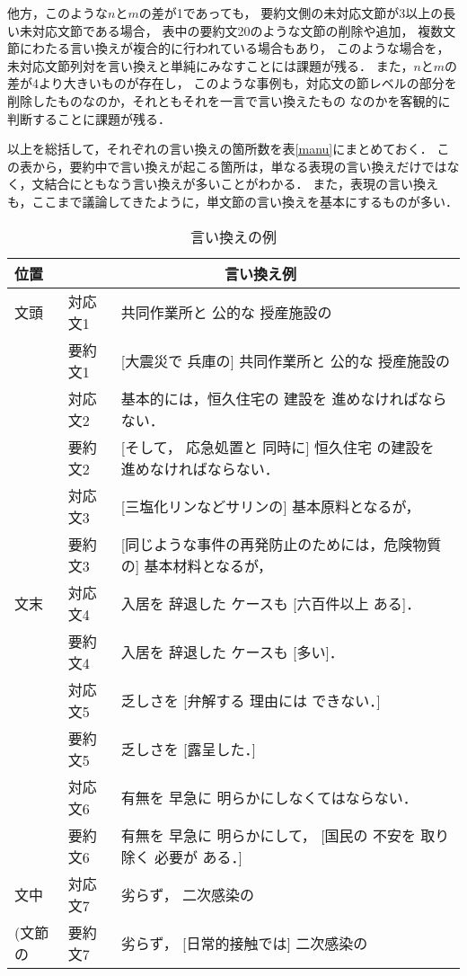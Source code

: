他方，このような$n$と$m$の差が1であっても，
要約文側の未対応文節が3以上の長い未対応文節である場合，
表中の要約文20のような文節の削除や追加，
複数文節にわたる言い換えが複合的に行われている場合もあり，
このような場合を，未対応文節列対を言い換えと単純にみなすことには課題が残る．
また，$n$と$m$の差が4より大きいものが存在し，
このような事例も，対応文の節レベルの部分を削除したものなのか，それともそれを一言で言い換えたもの
なのかを客観的に判断することに課題が残る．

以上を総括して，それぞれの言い換えの箇所数を表\ref{manu}にまとめておく．
この表から，要約中で言い換えが起こる箇所は，単なる表現の言い換えだけではなく，文結合にともなう言い換えが多いことがわかる．
また，表現の言い換えも，ここまで議論してきたように，単文節の言い換えを基本にするものが多い．


\begin{table}
\caption{言い換えの例}
\label{paralist}
\begin{center}
\small
\begin{tabular}{|l|ll|}
\hline
位置&\multicolumn{2}{|c|}{言い換え例} \\ \hline \hline
文頭&対応文1 & 共同作業所と 公的な 授産施設の \\ 
    &要約文1 & [大震災で 兵庫の] 共同作業所と 公的な 授産施設の \\
    &対応文2 & 基本的には，恒久住宅の 建設を 進めなければならない．\\
    &要約文2 & [そして， 応急処置と 同時に] 恒久住宅 の建設を 進めなければならない．\\
    &対応文3 & [三塩化リンなどサリンの] 基本原料となるが， \\
    &要約文3 & [同じような事件の再発防止のためには，危険物質の] 基本材料となるが，\\ \hline
文末&対応文4 & 入居を 辞退した ケースも [六百件以上 ある]．\\
    &要約文4 & 入居を 辞退した ケースも [多い]．\\
    &対応文5 & 乏しさを [弁解する 理由には できない．] \\
    &要約文5 & 乏しさを [露呈した．] \\
    &対応文6 & 有無を 早急に 明らかにしなくてはならない． \\
    &要約文6 & 有無を 早急に 明らかにして， [国民の 不安を 取り除く 必要が ある．] \\ \hline
文中&対応文7 & 劣らず， 二次感染の \\
(文節の&要約文7 & 劣らず， [日常的接触では] 二次感染の \\ 

\end{tabular}
\end{center}
\end{table}
